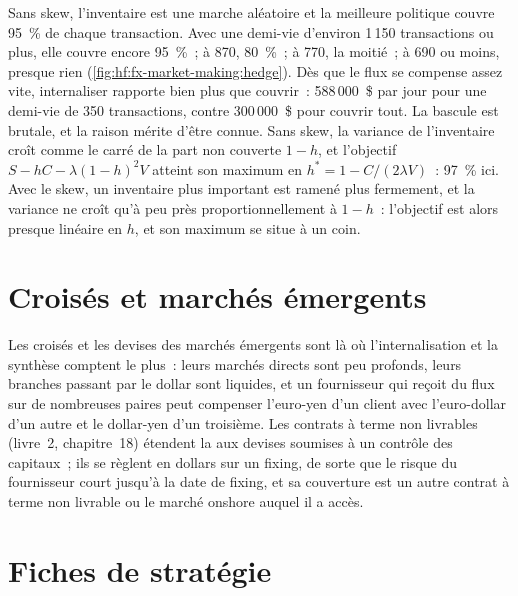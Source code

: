 Sans skew, l'inventaire est une marche aléatoire et la meilleure politique couvre 95~\% de chaque transaction. Avec une demi-vie d'environ 1\,150 transactions ou plus, elle couvre encore
95~\%~; à 870, 80~\%~; à 770, la moitié~; à 690 ou moins, presque rien (\cref{fig:hf:fx-market-making:hedge}). Dès que le flux se compense assez vite,
internaliser rapporte bien plus que couvrir~: 588\,000~\$ par jour pour une demi-vie de 350 transactions, contre 300\,000~\$ pour couvrir tout. La bascule
est brutale, et la raison mérite d'être connue. Sans skew, la variance de l'inventaire croît comme le carré de la part non couverte $1-h$, et l'objectif
$S-hC-\lambda(1-h)^2V$ atteint son maximum en $h^\ast=1-C/(2\lambda V)$~: 97~\% ici. Avec le skew, un inventaire plus important est ramené plus fermement, et la
variance ne croît qu'à peu près proportionnellement à $1-h$~: l'objectif est alors presque linéaire en $h$, et son maximum se situe à un coin.

\section{Croisés et marchés émergents}

Les croisés et les devises des marchés émergents sont là où l'internalisation et la synthèse comptent le plus~: leurs marchés directs sont peu profonds, leurs branches
passant par le dollar sont liquides, et un fournisseur qui reçoit du flux sur de nombreuses paires peut compenser l'euro-yen d'un client avec l'euro-dollar d'un autre et le dollar-yen d'un troisième.
Les contrats à terme non livrables (livre~2, chapitre~18) étendent la  aux devises soumises à un contrôle des capitaux~; ils se règlent en dollars sur un
fixing, de sorte que le risque du fournisseur court jusqu'à la date de fixing, et sa couverture est un autre contrat à terme non livrable ou le marché onshore auquel il a accès.

\section{Fiches de stratégie}

